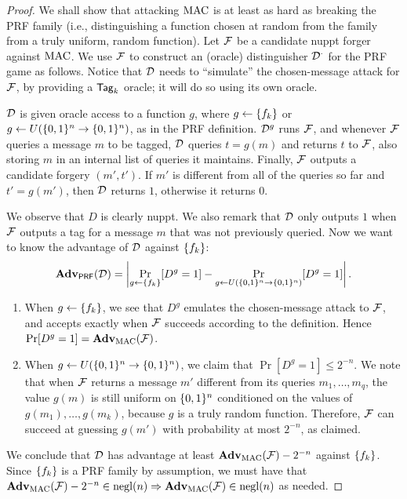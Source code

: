 \documentclass[11pt]{article}
\begin{document}
\begin{proof}
  We shall show that attacking $\text{MAC}$ is at least as hard as breaking
  the PRF family (i.e., distinguishing a function chosen at random
  from the family from a truly uniform, random function).  Let $\mathcal{F}$
  be a candidate nuppt forger against $\text{MAC}$.  We use $\mathcal{F}$ to
  construct an (oracle) distinguisher $\mathcal{D}^{\cdot}$ for the PRF game
  as follows.  Notice that $\mathcal{D}$ needs to ``simulate'' the
  chosen-message attack for $\mathcal{F}$, by providing a $\mathsf{Tag}_{k}$
  oracle; it will do so using its own oracle.
  
  $\mathcal{D}$ is given oracle access to a function $g$, where $g \gets
  \{f_k\}$ or $g \gets U(\{0,1\}^n \to \{0,1\}^n)$, as in the PRF
  definition.  $\mathcal{D}^{g}$ runs $\mathcal{F}$, and whenever $\mathcal{F}$ queries a
  message $m$ to be tagged, $\mathcal{D}$ queries $t = g(m)$ and returns $t$
  to $\mathcal{F}$, also storing $m$ in an internal list of queries it
  maintains.  Finally, $\mathcal{F}$ outputs a candidate forgery $(m',t')$.
  If $m'$ is different from all of the queries so far and $t' =
  g(m')$, then $\mathcal{D}$ returns $1$, otherwise it returns $0$.

  We observe that $D$ is clearly nuppt.  We also remark that $\mathcal{D}$
  only outputs $1$ when $\mathcal{F}$ outputs a tag for a message $m$ that
  was not previously queried.  Now we want to know the advantage of
  $\mathcal{D}$ against $\{f_k\}$:
  \[
  \mathbf{Adv}_{\mathsf{PRF}}(\mathcal{D}) = \left|\Pr_{g \gets \{f_k\}}[D^g = 1] -
    \Pr_{g \gets U(\{0,1\}^n \to \{0,1\}^n)}[D^g = 1]\right|.
  \]
  \begin{enumerate}
  \item When $g \gets \{f_k\}$, we see that $D^g$ emulates the
    chosen-message attack to $\mathcal{F}$, and accepts exactly when $\mathcal{F}$
    succeeds according to the definition.  Hence $\Pr[D^g = 1] =
    \mathbf{Adv}_{\text{MAC}}(\mathcal{F})$.
  \item When $g \gets U(\{0,1\}^n \to \{0,1\}^n)$, we claim that $\Pr[D^g =
    1] \leq 2^{-n}$.  We note that when $\mathcal{F}$ returns a message $m'$
    different from its queries $m_1,\dots,m_q$, the value $g(m)$ is
    still uniform on $\{0,1\}^n$ conditioned on the values of
    $g(m_1),\dots,g(m_k)$, because $g$ is a truly random function.
    Therefore, $\mathcal{F}$ can succeed at guessing $g(m')$ with probability
    at most $2^{-n}$, as claimed.
  \end{enumerate}
  We conclude that $\mathcal{D}$ has advantage at least $\mathbf{Adv}_{\text{MAC}}(\mathcal{F})
  - 2^{-n}$ against $\{f_k\}$.  Since $\{f_k\}$ is a PRF family by
  assumption, we must have that $\mathbf{Adv}_{\text{MAC}}(\mathcal{F}) - 2^{-n} \in
  \operatorname{negl}(n) \Rightarrow \mathbf{Adv}_{\text{MAC}}(\mathcal{F}) \in \operatorname{negl}(n)$ as needed.
\end{proof}
\end{document}
